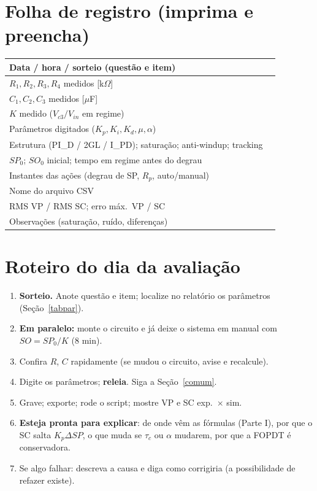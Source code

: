 \documentclass[11pt,a4paper]{article}
\begin{document}
\section{Folha de registro (imprima e preencha)}
\begin{center}\small
\begin{tabular}{|p{5.2cm}|p{9.5cm}|}\hline
Data / hora / sorteio (questão e item) & \\\hline
$R_1,R_2,R_3,R_4$ medidos [k$\Omega$] & \\\hline
$C_1,C_2,C_3$ medidos [$\mu$F] & \\\hline
$K$ medido ($V_{c3}/V_{in}$ em regime) & \\\hline
Parâmetros digitados ($K_p,K_i,K_d,\mu,\alpha$) & \\\hline
Estrutura (PI\_D / 2GL / I\_PD); saturação; anti-windup; tracking & \\\hline
$SP_0$; $SO_0$ inicial; tempo em regime antes do degrau & \\\hline
Instantes das ações (degrau de SP, $R_p$, auto/manual) & \\\hline
Nome do arquivo CSV & \\\hline
RMS VP / RMS SC; erro máx.\ VP / SC & \\\hline
Observações (saturação, ruído, diferenças) & \\\hline
\end{tabular}\end{center}

\section{Roteiro do dia da avaliação}
\begin{enumerate}
\item \textbf{Sorteio.} Anote questão e item; localize no relatório os parâmetros (Seção~\ref{tabpar}).
\item \textbf{Em paralelo:} monte o circuito e já deixe o sistema em manual com $SO=SP_0/K$ (8 min).
\item Confira $R$, $C$ rapidamente (se mudou o circuito, avise e recalcule).
\item Digite os parâmetros; \textbf{releia}. Siga a Seção~\ref{comum}.
\item Grave; exporte; rode o script; mostre VP e SC exp.\ $\times$ sim.
\item \textbf{Esteja pronta para explicar}: de onde vêm as fórmulas (Parte I), por que o SC salta $K_p\Delta SP$, o que muda se $\tau_c$ ou $\alpha$ mudarem, por que a FOPDT é conservadora.
\item Se algo falhar: descreva a causa e diga como corrigiria (a possibilidade de refazer existe).
\end{enumerate}
\end{document}
